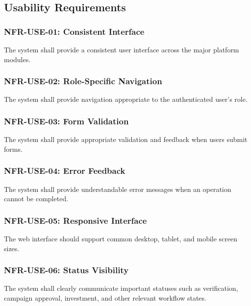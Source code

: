 
\subsection{Usability Requirements}

\subsubsection{NFR-USE-01: Consistent Interface}

The system shall provide a consistent user interface across the major
platform modules.

\subsubsection{NFR-USE-02: Role-Specific Navigation}

The system shall provide navigation appropriate to the authenticated
user's role.

\subsubsection{NFR-USE-03: Form Validation}

The system shall provide appropriate validation and feedback when users
submit forms.

\subsubsection{NFR-USE-04: Error Feedback}

The system shall provide understandable error messages when an operation
cannot be completed.

\subsubsection{NFR-USE-05: Responsive Interface}

The web interface should support common desktop, tablet, and mobile
screen sizes.

\subsubsection{NFR-USE-06: Status Visibility}

The system shall clearly communicate important statuses such as
verification, campaign approval, investment, and other relevant workflow
states.


